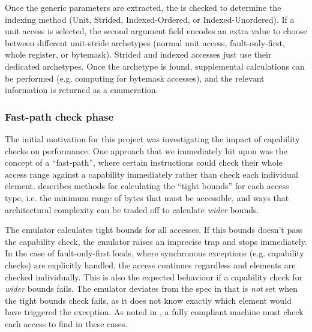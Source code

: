 Once the generic parameters are extracted, the  is checked to determine the indexing method (Unit, Strided, Indexed-Ordered, or Indexed-Unordered).
If a unit access is selected, the second argument field encodes an extra value to choose between different unit-stride archetypes (normal unit access, fault-only-first, whole register, or bytemask).
Strided and indexed accesses just use their dedicated archetypes.
Once the archetype is found, supplemental calculations can be performed (e.g. computing  for bytemask accesses), and the relevant information is returned as a  enumeration.


\subsubsection{Fast-path check phase}


The initial motivation for this project was investigating the impact of capability checks on performance.
One approach that we immediately hit upon was the concept of a \enquote{fast-path}, where certain instructions could check their whole access range against a capability immediately rather than check each individual element.
 describes methods for calculating the \enquote{tight bounds} for each access type, i.e. the minimum range of bytes that must be accessible, and ways that architectural complexity can be traded off to calculate \emph{wider} bounds.

The emulator calculates tight bounds for all accesses.
If this bounds doesn't pass the capability check, the emulator raises an imprecise trap and stops immediately.
In the case of fault-only-first loads, where synchronous exceptions (e.g. capability checks) are explicitly handled, the access continues regardless and elements are checked individually.
This is also the expected behaviour if a capability check for \emph{wider} bounds fails.
The emulator deviates from the spec in that  is \emph{not} set when the tight bounds check fails, as it does not know exactly which element would have triggered the exception.
As noted in , a fully compliant machine must check each access to find  in these cases.

